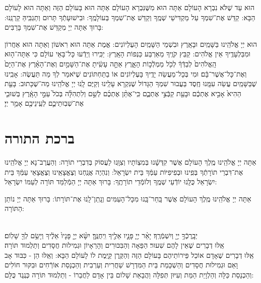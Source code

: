 \documentclass[twoside, openany, parskip=half, 11pt]{book}
\begin{document}
הוּא עַד שֶׁלֹּא נִבְרָא הָעוֹלָם אַתָּה הוּא מִשֶּׁנִּבְרָא הָעוֹלָם אַתָּה הוּא בָּעוֹלָם הַזֶּה וְאַתָּה הוּא לָעוֹלָם הַבָּא: קַדֵּשׁ אֶת־שִׁמְךָ עַל מַקְדִּישֵׁי שְׁמֶֽךָ וְקַדֵּשׁ אֶת־שִׁמְךָ בְּעוֹלָמֶֽךָ: וּבִישׁוּעָתְֿךָ תָּרוּם וְתַגְבִּֽיהַּ קַרְנֵֽנוּ: בָּרוּךְ אַתָּה יְיָ מְקַדֵּשׁ אֶת־שִׁמְךָ בָּרַבִּים:
 
 הוּא יְיָ אֱלֹהֵֽינוּ בַּשָּׁמַֽיִם וּבָאָֽרֶץ וּבִשְׁמֵי הַשָּׁמַֽיִם הָעֶלְיוֹנִים: אֱמֶת אַתָּה הוּא רִאשׁוֹן וְאַתָּה הוּא אַחֲרוֹן וּמִבַּלְעָדֶֽיךָ אֵין אֱלֹהִים: קַבֵּץ קֹוֶֽיךָ מֵאַרְבַּע כַּנְפוֹת הָאָֽרֶץ: יַכִּֽירוּ וְיֵדְֿעוּ כָּל־בָּאֵי עוֹלָם כִּי 
אַתָּה־ה֤וּא הָֽאֱלֹהִים֙ לְבַדְּֿךָ֔ לְכֹ֖ל מַמְלְֿכ֣וֹת הָאָ֑רֶץ אַתָּ֣ה עָשִֽׂ֔יתָ
אֶת־הַשָּׁמַ֣יִם וְאֶת־הָאָ֗רֶץ אֶת־הַיָּם֙ וְאֶת־כָּל־אֲשֶׁר־בָּ֔ם׃ וּמִי בְּכָל־מַעֲשֵׂה יָדֶֽיךָ בָּעֶלְיוֹנִים אוֹ בַתַּחְתּוֹנִים שֶׁיֹּאמַר לְךָ מַה תַּעֲשֶׂה: אָבִֽינוּ שֶׁבַּשָּׁמַֽיִם עֲשֵׂה עִמָּֽנוּ חֶֽסֶד בַּעֲבוּר שִׁמְךָ הַגָּדוֹל שֶׁנִּקְרָא עָלֵֽינוּ וְקַיֶּם לָֽנוּ יְיָ אֱלֹהֵֽינוּ מַה־שֶׁכָּתוּב:
בָּעֵ֤ת הַהִיא֙ אָבִ֣יא אֶתְכֶ֔ם וּבָעֵ֖ת קַבְּֿצִ֣י אֶתְכֶ֑ם כִּֽי־אֶתֵּ֨ן אֶתְכֶ֜ם לְשֵׁ֣ם וְלִתְהִלָּ֗ה בְּכֹל֙ עַמֵּ֣י הָאָֽ֔רֶץ בְּשׁוּבִ֧י אֶת־שְׁבֽוּתֵיכֶ֛ם לְעֵֽינֵיכֶ֖ם אָמַ֥ר יְיָ׃



\section[ברכת התורה]{ ברכת התורה }

אַתָּה יְיָ אֱלֹהֵֽינוּ מֶֽלֶךְ הָעוֹלָם אֲשֶׁר קִדְּשָֽֿׁנוּ בְּמִצְוֹתָיו וְצִוָּֽנוּ לַעֲסוֹק בְּדִבְרֵי תוֹרָה: וְהַעֲרֶב־נָא יְיָ אֱלֹהֵֽינוּ אֶת־דִּבְרֵי תוֹרָתְֿךָ בְּפִֽינוּ וּבְפִיפִיּוֹת עַמְּֿךָ בֵּית יִשְׂרָאֵל: וְנִהְיֶה אֲנַֽחְנוּ וְצֶאֱצָאֵֽינוּ וְצֶאֱצָאֵי עַמְּֿךָ בֵּית יִשְׂרָאֵל כֻּלָּֽנוּ יוֹדְֿעֵי שְׁמֶֽךָ וְלוֹמְֿדֵי תוֹרָתֶֽךָ: בָּרוּךְ אַתָּה יְיָ הַמְֿלַמֵּד תּוֹרָה לְעַמּוֹ יִשְׂרָאֵל:
 
אַתָּה יְיָ אֱלֹהֵֽינוּ מֶֽלֶךְ הָעוֹלָם אֲשֶׁר בָּֽחַר־בָּֽנוּ מִכָּל־הָעַמִּים וְנָֽתַן־לָֽנוּ אֶת־תּוֹרָתוֹ: בָּרוּךְ אַתָּה יְיָ נוֹתֵן הַתּוֹרָה:

\begin{small}
\\
יְבָֽרֶכְֿךָ֥ יְיָ֖ וְיִשְׁמְֿרֶֽךָ׃ יָאֵ֨ר יְיָ֧ פָּנָ֛יו אֵלֶ֖יךָ וִֽיחֻנֶּֽךָּ׃ יִשָּׂ֨א יְיָ֤ פָּנָיו֙ אֵלֶ֔יךָ וְיָשֵׂ֥ם לְךָ֖ שָׁלֽוֹם׃\\
אֵֽלּוּ דְבָרִים שֶׁאֵין לָהֶם שִׁעוּר׃ 
הַפֵּאָה וְהַבִּכּוּרִים וְהָרֵאָיוֹן וּגְמִילוּת חֲסָדִים וְתַלְמוּד תּוֹרָה׃\\
אֵֽלּוּ 
דְבָרִים שֶׁאָדָם אוֹכֵל פֵּירוֹתֵיהֶם בָּעוֹלָם הַזֶּה וְהַקֶּֽרֶן קַיֶּֽמֶת לוֹ לָעוֹלָם הַבָּא: וְאֵֽלּוּ הֵן - כִּבּוּד אָב וָאֵם וּגְמִילוּת חֲסָדִים וְהַשְׁכָּמַת בֵּית הַמִּדְרָשׁ שַׁחֲרִית וְעַרְבִית וְהַכְנָסַת אוֹרְֿחִים וּבִקּוּר חוֹלִים וְהַכְנָסַת כַּלָּה וְהַלְוָיַת הַמֵּת וְעִיּוּן תְּפִלָּה וַהֲבָאַת שָׁלוֹם בֵּין אָדָם לַחֲבֵרוֹ - וְתַלְמוּד תּוֹרָה כְּנֶֽגֶד כֻּלָּם:
\end{small}
\end{document}
